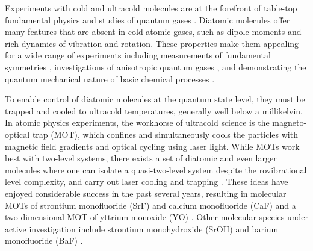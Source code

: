\documentclass[amsmath,amssymb,aps,twocolumn,longbibliography,notitlepage]{revtex4-1}
\begin{document}
Experiments with cold and ultracold molecules are at the forefront of table-top fundamental physics \cite{DeMillePT15_FundamentalPhysicsWithDiatomicMolecules} and studies of quantum gases \cite{YeMosesNPhys17_PolarMoleculeFrontiers}.  Diatomic molecules offer many features that are absent in cold atomic gases, such as dipole moments and rich dynamics of vibration and rotation.  These properties make them appealing for a wide range of experiments including measurements of fundamental symmetries \cite{ACMEScience14_ElectronEDM}, investigations of anisotropic quantum gases \cite{ReyHazzardPRL14_ManyBodyDynamicsPolarMolecules}, and demonstrating the quantum mechanical nature of basic chemical processes \cite{ZelevinskyMcDonaldNature16_Sr2PD}.

To enable control of diatomic molecules at the quantum state level, they must be trapped and cooled to ultracold temperatures, generally well below a millikelvin.  In atomic physics experiments, the workhorse of ultracold science is the magneto-optical trap (MOT), which confines and simultaneously cools the particles with magnetic field gradients and optical cycling using laser light.  While MOTs work best with two-level systems, there exists a set of diatomic and even larger molecules where one can isolate a quasi-two-level system despite the rovibrational level complexity, and carry out laser cooling and trapping \cite{DiRosaEPJD04_LaserCoolingMolecules,YeStuhlPRL08_PolarMoleculeMOT}.  These ideas have enjoyed considerable success in the past several years, resulting in molecular MOTs of strontium monofluoride (SrF) and calcium monofluoride (CaF) \cite{DeMilleSteineckerCPC16_ImprovedSrF_RF_MOT,TarbuttTruppeArXiv17_CaFBelowDopplerLimit,DoyleAndereggArXiv17_CaF_RF_MOT} and a two-dimensional MOT of yttrium monoxide (YO) \cite{YeHummonPRL13_YO_MOT}.  Other molecular species under active investigation include strontium monohydroxide (SrOH) \cite{DoyleKozyryevPRL17_SrOHSisyphusCooling} and barium monofluoride (BaF) \cite{YanBuPRA17_BaFBufferGasSpectrosc}.
\end{document}
